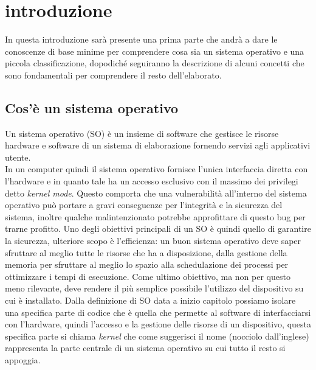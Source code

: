 \chapter{introduzione}
In questa introduzione sarà presente una prima parte che andrà a dare le conoscenze di base minime per comprendere cosa sia un sistema operativo e una piccola classificazione, dopodiché seguiranno la descrizione di alcuni concetti che sono fondamentali per comprendere il resto dell'elaborato.
\section{Cos'è un sistema operativo}
Un sistema operativo (SO) è un insieme di software che gestisce le risorse hardware e software di un sistema di elaborazione fornendo servizi agli applicativi utente.\\
In un computer quindi il sistema operativo fornisce l'unica interfaccia diretta con l'hardware e in quanto tale ha un accesso esclusivo con il massimo dei privilegi detto \textit{kernel mode}. Questo comporta che una vulnerabilità all'interno del sistema operativo può portare a gravi conseguenze per l'integrità e la sicurezza del sistema, inoltre qualche malintenzionato potrebbe approfittare di questo bug per trarne profitto.
Uno degli obiettivi principali di un SO è quindi quello di garantire la sicurezza, ulteriore scopo è l'efficienza: un buon sistema operativo deve saper sfruttare al meglio tutte le risorse che ha a disposizione, dalla gestione della memoria per sfruttare al meglio lo spazio alla schedulazione dei processi per ottimizzare i tempi di esecuzione. Come ultimo obiettivo, ma non per questo meno rilevante, deve rendere il più semplice possibile l'utilizzo del dispositivo su cui è installato.
Dalla definizione di SO data a inizio capitolo possiamo isolare una specifica parte di codice che è quella che permette al software di interfacciarsi con l'hardware, quindi l'accesso e la gestione delle risorse di un dispositivo, questa specifica parte si chiama \textit{kernel} che come suggerisci il nome (nocciolo dall'inglese) rappresenta la parte centrale di un sistema operativo su cui tutto il resto si appoggia.\\
\newpage
